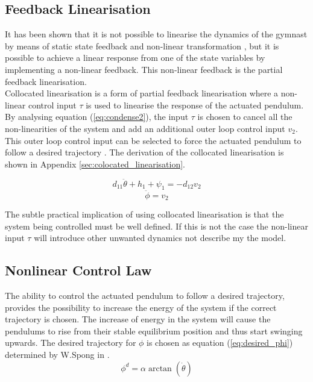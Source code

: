 \subsection{Feedback Linearisation}
It has been shown that it is not possible to linearise the dynamics of the gymnast by means of static state feedback and non-linear transformation \cite{murray}, but it is possible to achieve a linear response from one of the state variables by implementing a non-linear feedback. This non-linear feedback is the partial feedback linearisation.\\

Collocated linearisation is a form of partial feedback linearisation where a non-linear control input $\tau$ is used to linearise the response of the actuated pendulum. By analysing equation (\ref{eq:condense2}), the input $\tau$ is chosen to cancel all the non-linearities of the system and add an additional outer loop control input $v_{2}$. This outer loop control input can be selected to force the actuated pendulum to follow a desired trajectory \citep{spong_swingup}. The derivation of the collocated linearisation is shown in Appendix \ref{sec:colocated_linearisation}.

\begin{equation} \label{eq:collocated_lin1}
d_{11}\ddot{\theta} + h_{1} + \psi_{1} = -d_{12}v_{2}
\end{equation}
\begin{equation} \label{eq:collocated_lin2}
\ddot{\phi} = v_{2}
\end{equation}

The subtle practical implication of using collocated linearisation is that the system being controlled must be well defined. If this is not the case the non-linear input $\tau$ will introduce other unwanted dynamics not describe my the model.

\subsection{Nonlinear Control Law}

The ability to control the actuated pendulum to follow a desired trajectory, provides the possibility to increase the energy of the system if the correct trajectory is chosen. The increase of energy in the system will cause the pendulums to rise from their stable equilibrium position and thus start swinging upwards. The desired trajectory for ${\phi}$ is chosen as equation (\ref{eq:desired_phi}) determined by W.Spong in \citep{spong_swingup}.
\begin{equation} \label{eq:desired_phi}
\phi^{d} =  \alpha \arctan(\dot{\theta})
\end{equation}

